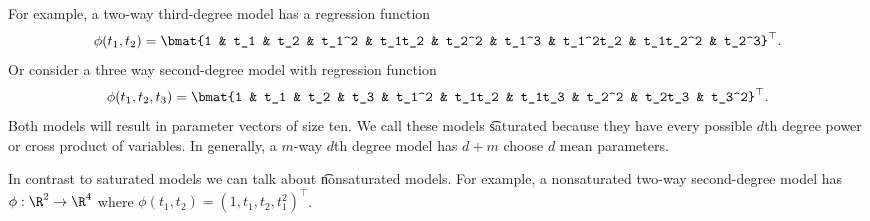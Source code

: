 For example, a two-way third-degree model has a regression function
    \[
\phi (t_1, t_2) = \bmat{1 & t_1 & t_2 & t_1^2 & t_1t_2 & t_2^2 & t_1^3 & t_1^2t_2 & t_1t_2^2 & t_2^3}^\top .
    \]
Or consider a three way second-degree model with regression function
    \[
\phi (t_1, t_2, t_3) = \bmat{1 & t_1 & t_2 & t_3 & t_1^2 & t_1t_2 & t_1t_3 & t_2^2 & t_2t_3 & t_3^2}^\top .
    \]
Both models will result in parameter vectors of size ten.
We call these models \t{saturated} because they have every possible $d$th degree power or cross product of variables.
In generally, a $m$-way $d$th degree model has $d+m$ choose $d$ mean parameters.

In contrast to saturated models we can talk about \t{nonsaturated} models.
For example, a nonsaturated two-way second-degree model has $\phi : \R ^2 \to \R ^4$ where $\phi (t_1, t_2) = (1 , t_1 , t_2 , t_1^2)^\top $.
